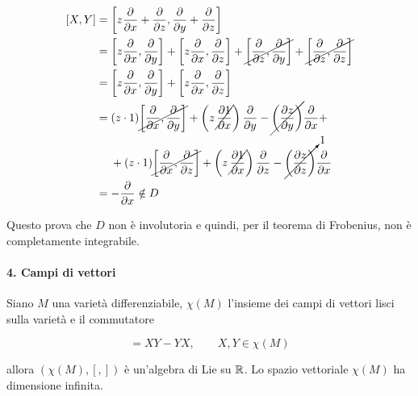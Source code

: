\begin{align}
	\begin{split}
		[X,Y] &= \left[ z \dfrac{\partial}{\partial x} + \dfrac{\partial}{\partial z} , \dfrac{\partial}{\partial y} + \dfrac{\partial}{\partial z} \right]\\
		&= \left[ z \dfrac{\partial}{\partial x}, \dfrac{\partial}{\partial y} \right] + \left[ z \dfrac{\partial}{\partial x}, \dfrac{\partial}{\partial z} \right] + \cancel{\left[ \dfrac{\partial}{\partial z}, \dfrac{\partial}{\partial y} \right]} + \cancel{\left[ \dfrac{\partial}{\partial z}, \dfrac{\partial}{\partial z} \right]}\\
		&= \left[ z \dfrac{\partial}{\partial x}, \dfrac{\partial}{\partial y} \right] + \left[ z \dfrac{\partial}{\partial x}, \dfrac{\partial}{\partial z} \right]\\
		&= (z \cdot 1) \cancel{\left[ \dfrac{\partial}{\partial x}, \dfrac{\partial}{\partial y} \right]} + \left( z \, \cancel{\dfrac{\partial 1}{\partial x}} \right) \dfrac{\partial}{\partial y} - \cancel{\left( \dfrac{\partial z}{\partial y} \right)} \dfrac{\partial}{\partial x} + \\
		& \hspace{13px} + (z \cdot 1) \cancel{\left[ \dfrac{\partial}{\partial x}, \dfrac{\partial}{\partial z} \right]} + \left( z \, \cancel{\dfrac{\partial 1}{\partial x}} \right) \dfrac{\partial}{\partial z} - \cancelto{1}{\left( \dfrac{\partial z}{\partial z} \right)} \dfrac{\partial}{\partial x}\\
		&= - \dfrac{\partial}{\partial x} \notin D
	\end{split}
\end{align}

Questo prova che $ D $ non è involutoria e quindi, per il teorema di Frobenius, non è completamente integrabile.

\paragraph{4. Campi di vettori}

Siano $ M $ una varietà differenziabile, $ \chi(M) $ l'insieme dei campi di vettori lisci sulla varietà e il commutatore

\begin{equation}
	[X,Y] = XY - YX, \qquad X,Y \in \chi(M)
\end{equation}

allora $ (\chi(M),[,]) $ è un'algebra di Lie su $ \mathbb{R} $. Lo spazio vettoriale $ \chi(M) $ ha dimensione infinita.

